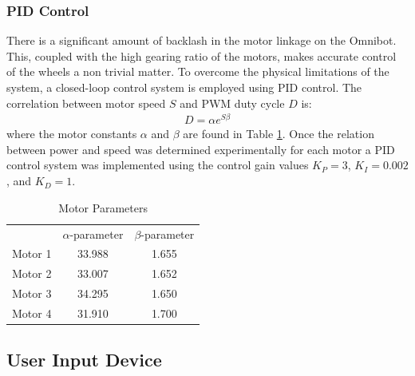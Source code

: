 \documentclass[onecolumn,10pt,final]{asme2ej}
\begin{document}
\subsubsection{PID Control}

There is a significant amount of backlash in the motor linkage on the Omnibot. This, coupled with the high gearing ratio of the motors, makes accurate control of the wheels a non trivial matter. To overcome the physical limitations of the system, a closed-loop control system is employed using PID control. The correlation between motor speed $S$ and PWM duty cycle $D$ is:
\begin{align}
D = \alpha e ^{S\beta}
\end{align}
where the motor constants $\alpha$ and $\beta$ are found in Table \ref{tab:pid}. Once the relation between power and speed was determined experimentally for each motor a PID control system was implemented using the control gain values $K_P = 3$, $K_I = 0.002$, and $K_D = 1$.\\


\begin{table}
\centering
\caption{Motor Parameters}
\begin{tabular}{ l | c | c | }
\cline{2-3}
  & $\alpha$-parameter & $\beta$-parameter \\ \cline{2-3}
Motor 1 & 33.988 & 1.655 \\ \cline{2-3}
Motor 2 & 33.007 & 1.652 \\ \cline{2-3}
Motor 3 & 34.295 & 1.650 \\ \cline{2-3}
Motor 4 & 31.910 & 1.700 \\ \cline{2-3}
\end{tabular}
\label{tab:pid}
\end{table}

\subsection{User Input Device}

\end{document}

